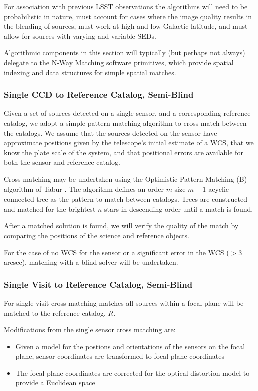 For association with previous LSST observations the algorithms will
need to be probabilistic in nature, must account for cases where the
image quality results in the blending of sources, must work at high
and low Galactic latitude, and must allow for sources with varying and
variable SEDs.

Algorithmic components in this section will typically (but perhaps not always) delegate to the \hyperref[sec:spTablesNWayMatching]{N-Way Matching} software primitives, which provide spatial indexing and data structures for simple spatial matches.

\subsubsection{Single CCD to Reference Catalog, Semi-Blind}
\label{sec:acSingleCCDReferenceMatching}

Given a set of sources detected on a single sensor, and a corresponding reference catalog, we adopt a simple pattern matching algorithm to cross-match between the catalogs.
We assume that the sources detected on the sensor have approximate positions given by the telescope's initial estimate of a WCS, that we know the plate scale of the system, and that positional errors are available for both the sensor and reference catalog.

Cross-matching may be undertaken using the Optimistic Pattern Matching (B) algorithm of Tabur \cite{2007PASA...24..189T}.
The algorithm defines an order $m$ size $m-1$ acyclic connected tree as the pattern to match between catalogs.
Trees are constructed and matched for the brightest $n$ stars in descending order until a match is found.

After a matched solution is found, we will verify the quality of the match by comparing the positions of the science and reference objects.

For the case of no WCS for the sensor or a significant error in the
WCS ($> 3$ arcsec), matching with a blind solver will be undertaken.

\subsubsection{Single Visit to Reference Catalog, Semi-Blind}
\label{sec:acSingleVisitReferenceMatching}

For single visit cross-matching matches all sources within a focal
plane will be matched to the reference catalog, $R$.

Modifications from the single sensor cross matching are:
\begin{itemize}
\item Given a model for the postions and orientations of the sensors
  on the focal plane, sensor coordinates are transformed to focal plane
  coordinates
\item The focal plane coordinates are corrected for the optical distortion model to provide a Euclidean space
\end{itemize}


